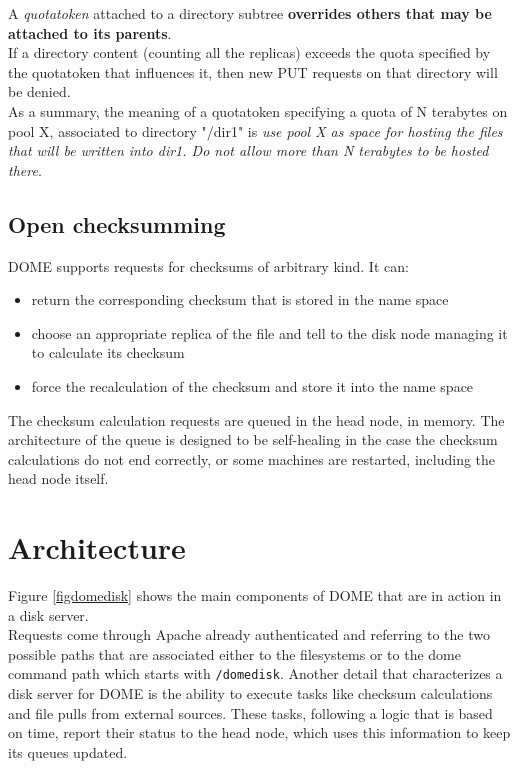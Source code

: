 \documentclass[a4paper]{jpconf}
\begin{document}
A \textit{quotatoken} attached to a directory subtree \textbf{overrides others that may be attached to its parents}.\\
If a directory content (counting all the replicas) exceeds the quota specified by the quotatoken that influences it,
then new PUT requests on that directory will be denied.\\

As a summary, the meaning of a quotatoken specifying a quota of N terabytes on pool X, associated to directory "/dir1" is \textit{use pool X as
space for hosting the files that will be written into \/dir1. Do not allow more than N terabytes to be hosted there}.\\

\subsection{Open checksumming}
DOME supports requests for checksums of arbitrary kind. It can:\\

\begin{itemize}
 \item return the corresponding checksum that is stored in the name space
 \item choose an appropriate replica of the file and tell to the disk node managing it to calculate its checksum
 \item force the recalculation of the checksum and store it into the name space
\end{itemize}

The checksum calculation requests are queued in the head node, in memory. The architecture of the queue
is designed to be self-healing in the case the checksum calculations do not end correctly, or some machines are restarted,
including the head node itself.


\section{Architecture}
Figure \ref{figdomedisk} shows the main components of DOME that are in action in a disk server.\\
Requests come through Apache already authenticated and referring to the two possible paths that
are associated either to the filesystems or to the dome command path which starts with \lstinline{/domedisk}.
Another detail that characterizes a disk server for DOME is the ability to execute tasks like checksum calculations
and file pulls from external sources. These tasks, following a logic that is based on time, report their status
to the head node, which uses this information to keep its queues updated.\\
 
\end{document}
